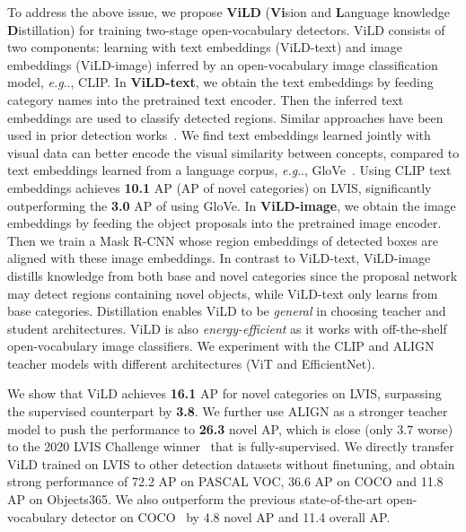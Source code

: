 \documentclass{article} \usepackage{iclr2022_conference,times}
\makeatletter
\DeclareRobustCommand\onedot{\futurelet\@let@token\@onedot}
\def\@onedot{\ifx\@let@token.\else.\null\fi\xspace}
\def\eg{\emph{e.g}\onedot} \def\Eg{\emph{E.g}\onedot}
\makeatother
\begin{document}
To address the above issue, we propose \textbf{ViLD} (\textbf{Vi}sion and \textbf{L}anguage knowledge \textbf{D}istillation) for training two-stage open-vocabulary detectors. ViLD consists of two components: learning with text embeddings (ViLD-text) and image embeddings (ViLD-image) inferred by an open-vocabulary image classification model, \eg, CLIP. 
In \textbf{ViLD-text}, we obtain the text embeddings by feeding category names into the pretrained text encoder.
Then the inferred text embeddings are used to classify detected regions.
Similar approaches have been used in prior detection works~\citep{bansal2018zero,rahman2018zero,zareian2021openvocabulary}.
We find text embeddings learned jointly with visual data can better encode the visual similarity between concepts, compared to text embeddings learned from a language corpus, \eg, GloVe~\citep{pennington2014glove}.
Using CLIP text embeddings achieves \textbf{10.1} AP (AP of novel categories) on LVIS, significantly outperforming the \textbf{3.0} AP of using GloVe.
In \textbf{ViLD-image}, we obtain the image embeddings by feeding the object proposals into the pretrained image encoder.
Then we train a Mask R-CNN whose region embeddings of detected boxes are aligned with these image embeddings.
In contrast to ViLD-text, ViLD-image distills knowledge from both base and novel categories since the proposal network may detect regions containing novel objects, while ViLD-text only learns from base categories.
Distillation enables ViLD to be \textit{general} in choosing teacher and student architectures. ViLD is also \textit{energy-efficient} as it works with off-the-shelf open-vocabulary image classifiers. We experiment with the CLIP and ALIGN~\citep{align} teacher models with different architectures (ViT and EfficientNet).

We show that ViLD achieves \textbf{16.1} AP for novel categories on LVIS, surpassing the supervised counterpart by \textbf{3.8}.
We further use ALIGN as a stronger teacher model to push the performance to \textbf{26.3} novel AP, which is close (only 3.7 worse) to the 2020 LVIS Challenge winner~\citep{huang2020joint} that is fully-supervised.
We directly transfer ViLD trained on LVIS to other detection datasets without finetuning, and obtain strong performance of 72.2 AP on PASCAL VOC, 36.6 AP on COCO and 11.8 AP on Objects365.
We also outperform the previous state-of-the-art open-vocabulary detector on COCO~\citep{zareian2021openvocabulary} by 4.8 novel AP and 11.4 overall AP.
\end{document}
